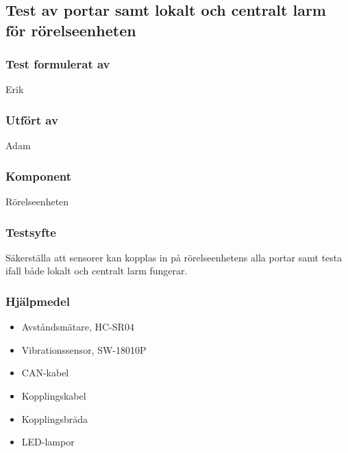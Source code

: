 \clearpage
\subsection{Test av portar samt lokalt och centralt larm för rörelseenheten}
\label{test:PortMotion}

\setlength{\columnsep}{1cm}




\begin{multicols}{2}
\subsubsection*{Test formulerat av}
Erik

\subsubsection*{Utfört av}
Adam


\end{multicols}
\subsubsection*{Komponent}
Rörelseenheten


\subsubsection*{Testsyfte}
Säkerställa att sensorer kan kopplas in på rörelseenhetens alla portar samt testa ifall både lokalt och centralt larm fungerar.

\subsubsection*{Hjälpmedel}
\begin{itemize}
	\item Avståndsmätare, HC-SR04
	\item Vibrationssensor, SW-18010P
	\item CAN-kabel
	\item Kopplingskabel
	\item Kopplingsbräda
	\item LED-lampor
\end{itemize}



